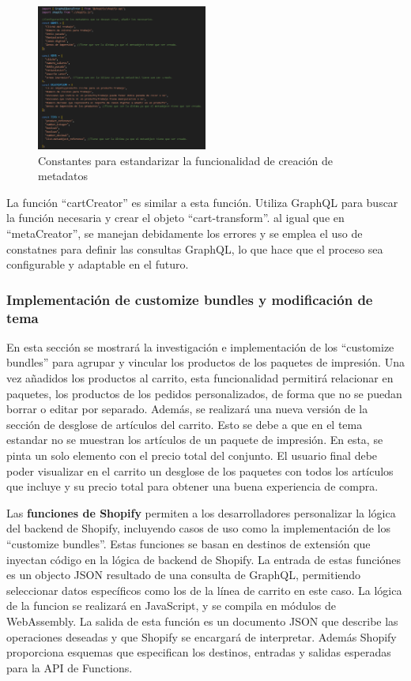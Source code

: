 \documentclass[12pt]{article}
\begin{document}
\begin{figure}[ht]
    \centering
    \includegraphics[width=0.5\textwidth]{imagenes-back/metafieldCreatorConstantes1.png}
    \caption{\label{fig:constantesMetafields} Constantes para estandarizar la funcionalidad de creación de metadatos }
    \vspace{\fill}
\end{figure}

La función ``cartCreator'' es similar a esta función. Utiliza GraphQL para buscar la función necesaria y crear el objeto ``cart-transform''.
al igual que en ``metaCreator'', se manejan debidamente los errores y se emplea el uso de constatnes para definir las consultas GraphQL, lo que 
hace que el proceso sea configurable y adaptable en el futuro.

\clearpage
\subsubsection{Implementación de customize bundles y modificación de tema}
En esta sección se mostrará la investigación e implementación de los ``customize bundles'' para agrupar y vincular los
productos de los paquetes de impresión. Una vez añadidos los productos al carrito, esta funcionalidad permitirá relacionar en paquetes, los productos de los pedidos personalizados, de forma que no se puedan borrar
o editar por separado. Además, se realizará una nueva versión de la sección de desglose de artículos del carrito. Esto se debe a que en el tema estandar no se muestran los artículos de un paquete 
de impresión. En esta, se pinta un solo elemento con el precio total del conjunto. El usuario final debe poder visualizar en el carrito un desglose de los paquetes con todos los artículos que incluye y su precio 
total para obtener una buena experiencia de compra.

Las \textbf{funciones de Shopify} \cite{shopify-functions} permiten a los desarrolladores personalizar la lógica del backend de Shopify, incluyendo casos de uso como la implementación de los
``customize bundles''. Estas funciones se basan en destinos de extensión que inyectan código en la lógica de backend de Shopify. La entrada de estas funciónes es un objecto JSON resultado de una
consulta de GraphQL, permitiendo seleccionar datos específicos como los de la línea de carrito en este caso. La lógica de la funcion se realizará en JavaScript, y se compila en módulos de WebAssembly.
La salida de esta función es un documento JSON que describe las operaciones deseadas y que Shopify se encargará de interpretar. Además Shopify proporciona esquemas que especifican los 
destinos, entradas y salidas esperadas para la API de Functions.
\end{document}
